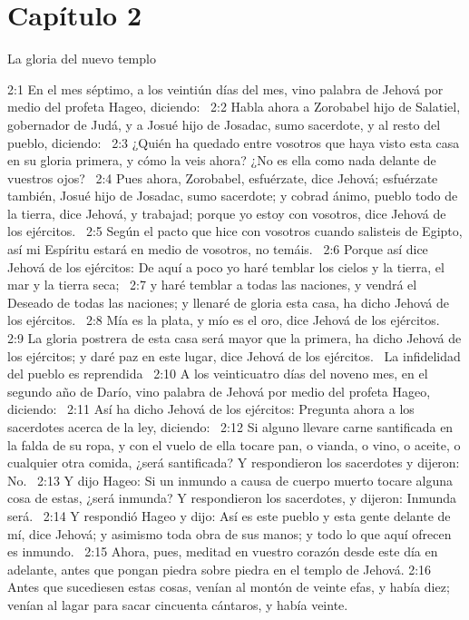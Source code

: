 \section*{Capítulo 2 }
La gloria del nuevo templo  

2:1 En el mes séptimo, a los veintiún días del mes, vino palabra de Jehová por medio del profeta Hageo, diciendo:  
2:2 Habla ahora a Zorobabel hijo de Salatiel, gobernador de Judá, y a Josué hijo de Josadac, sumo sacerdote, y al resto del pueblo, diciendo:  
2:3 ¿Quién ha quedado entre vosotros que haya visto esta casa en su gloria primera, y cómo la veis ahora? ¿No es ella como nada delante de vuestros ojos?  
2:4 Pues ahora, Zorobabel, esfuérzate, dice Jehová; esfuérzate también, Josué hijo de Josadac, sumo sacerdote; y cobrad ánimo, pueblo todo de la tierra, dice Jehová, y trabajad; porque yo estoy con vosotros, dice Jehová de los ejércitos.  
2:5 Según el pacto que hice con vosotros cuando salisteis de Egipto, así mi Espíritu estará en medio de vosotros, no temáis.  
2:6 Porque así dice Jehová de los ejércitos: De aquí a poco yo haré temblar los cielos y la tierra, el mar y la tierra seca;  
2:7 y haré temblar a todas las naciones, y vendrá el Deseado de todas las naciones; y llenaré de gloria esta casa, ha dicho Jehová de los ejércitos.  
2:8 Mía es la plata, y mío es el oro, dice Jehová de los ejércitos.  
2:9 La gloria postrera de esta casa será mayor que la primera, ha dicho Jehová de los ejércitos; y daré paz en este lugar, dice Jehová de los ejércitos.  
La infidelidad del pueblo es reprendida  
2:10 A los veinticuatro días del noveno mes, en el segundo año de Darío, vino palabra de Jehová por medio del profeta Hageo, diciendo:  
2:11 Así ha dicho Jehová de los ejércitos: Pregunta ahora a los sacerdotes acerca de la ley, diciendo:  
2:12 Si alguno llevare carne santificada en la falda de su ropa, y con el vuelo de ella tocare pan, o vianda, o vino, o aceite, o cualquier otra comida, ¿será santificada? Y respondieron los sacerdotes y dijeron: No.  
2:13 Y dijo Hageo: Si un inmundo a causa de cuerpo muerto tocare alguna cosa de estas, ¿será inmunda? Y respondieron los sacerdotes, y dijeron: Inmunda será.  
2:14 Y respondió Hageo y dijo: Así es este pueblo y esta gente delante de mí, dice Jehová; y asimismo toda obra de sus manos; y todo lo que aquí ofrecen es inmundo.  
2:15 Ahora, pues, meditad en vuestro corazón desde este día en adelante, antes que pongan piedra sobre piedra en el templo de Jehová. 
2:16 Antes que sucediesen estas cosas, venían al montón de veinte efas, y había diez; venían al lagar para sacar cincuenta cántaros, y había veinte.  
